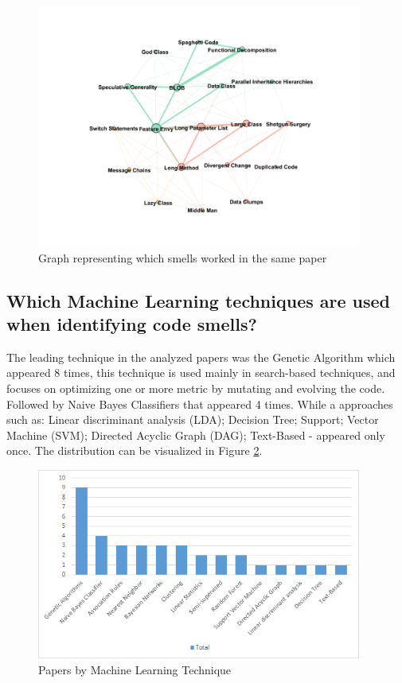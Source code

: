 \begin{figure}[!ht] 
    \centering
	\caption{Graph representing which smells worked in the same paper}
	\label{fig:smellsCoOccurrence}
	\includegraphics[width=0.95\textwidth]{imagens/smells_coocurrence_graph.png}
\end{figure}


\subsection{Which Machine Learning techniques are used when identifying code smells?}

The leading technique in the analyzed papers was the Genetic Algorithm which appeared 8 times, this technique is used mainly in search-based techniques, and focuses on optimizing one or more metric by mutating and evolving the code. Followed by Naive Bayes Classifiers that appeared 4 times. While a approaches such as: Linear discriminant analysis (LDA); Decision Tree; Support; Vector Machine (SVM); Directed Acyclic Graph (DAG); Text-Based - appeared only once. The distribution can be visualized in Figure \ref{fig:papersByMLTechnique}.

\begin{figure}[!ht] 
    \centering
	\caption{Papers by Machine Learning Technique}
	\label{fig:papersByMLTechnique}
	\includegraphics[width=0.95\textwidth]{imagens/papersByMLTechnique.png}
\end{figure}


